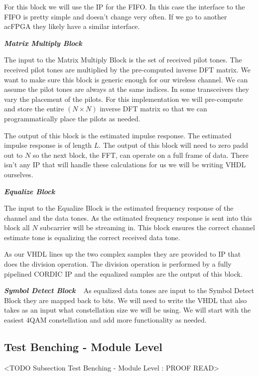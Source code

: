 For this block we will use the \ac{IP} for the \ac{FIFO}. In this case the interface to the \ac{FIFO} is pretty simple and doesn't change very often. If we go to another ac{FPGA} they likely have a similar interface.

{\bf \emph{Matrix Multiply Block}}

The input to the Matrix Multiply Block is the set of received pilot tones. The received pilot tones are multiplied by the pre-computed inverse \ac{DFT} matrix. We want to make sure this block is generic enough for our wireless channel. We can assume the pilot tones are always at the same indices. In some transceivers they vary the placement of the pilots. For this implementation we will pre-compute and store the entire $(N\times N)$ inverse \ac{DFT} matrix so that we can programmatically place the pilots as needed.

The output of this block is the estimated impulse response. The estimated impulse response is of length $L$. The output of this block will need to zero padd out to $N$ so the next block, the \ac{FFT}, can operate on a full frame of data. There isn't any \ac{IP} that will handle these calculations for us we will be writing \ac{VHDL} ourselves.

{\bf \emph{Equalize Block}}

The input to the Equalize Block is the estimated frequency response of the channel and the data tones. As the estimated frequency response is sent into this block all $N$ subcarrier will be streaming in. This block ensures the correct channel estimate tone is equalizing the correct received data tone.

As our \ac{VHDL} lines up the two complex samples they are provided to \ac{IP} that does the division operation. The division operation is performed by a fully pipelined \ac{CORDIC} \ac{IP} and the equalized samples are the output of this block.

{\bf \emph{Symbol Detect Block}} 
 
As equalized data tones are input to the Symbol Detect Block they are mapped back to bits. We will need to write the \ac{VHDL} that also takes as an input what constellation size we will be using. We will start with the easiest $4$\ac{QAM} constellation and add more functionality as needed. 

\subsection{Test Benching - Module Level}
	<TODO Subsection Test Benching - Module Level : PROOF READ>

